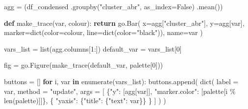 \documentclass[
  letterpaper,
  DIV=11,
  numbers=noendperiod]{scrreprt}
\newenvironment{Shaded}{\begin{snugshade}}{\end{snugshade}}
\newcommand{\BuiltInTok}[1]{\textcolor[rgb]{0.00,0.23,0.31}{#1}}
\newcommand{\ControlFlowTok}[1]{\textcolor[rgb]{0.00,0.23,0.31}{\textbf{#1}}}
\newcommand{\DecValTok}[1]{\textcolor[rgb]{0.68,0.00,0.00}{#1}}
\newcommand{\KeywordTok}[1]{\textcolor[rgb]{0.00,0.23,0.31}{\textbf{#1}}}
\newcommand{\NormalTok}[1]{\textcolor[rgb]{0.00,0.23,0.31}{#1}}
\newcommand{\OperatorTok}[1]{\textcolor[rgb]{0.37,0.37,0.37}{#1}}
\newcommand{\StringTok}[1]{\textcolor[rgb]{0.13,0.47,0.30}{#1}}
\newcommand{\VariableTok}[1]{\textcolor[rgb]{0.07,0.07,0.07}{#1}}
\begin{document}
\begin{Shaded}
\begin{Highlighting}[]
\NormalTok{agg }\OperatorTok{=}\NormalTok{ (df\_condensed}
\NormalTok{       .groupby(}\StringTok{"cluster\_abr"}\NormalTok{, as\_index}\OperatorTok{=}\VariableTok{False}\NormalTok{)}
\NormalTok{       .mean())}

\KeywordTok{def}\NormalTok{ make\_trace(var, colour):}
    \ControlFlowTok{return}\NormalTok{ go.Bar(}
\NormalTok{        x}\OperatorTok{=}\NormalTok{agg[}\StringTok{"cluster\_abr"}\NormalTok{],}
\NormalTok{        y}\OperatorTok{=}\NormalTok{agg[var],}
\NormalTok{        marker}\OperatorTok{=}\BuiltInTok{dict}\NormalTok{(color}\OperatorTok{=}\NormalTok{colour, line}\OperatorTok{=}\BuiltInTok{dict}\NormalTok{(color}\OperatorTok{=}\StringTok{"black"}\NormalTok{)),}
\NormalTok{        name}\OperatorTok{=}\NormalTok{var}
\NormalTok{    )}

\NormalTok{vars\_list   }\OperatorTok{=} \BuiltInTok{list}\NormalTok{(agg.columns[}\DecValTok{1}\NormalTok{:])}
\NormalTok{default\_var }\OperatorTok{=}\NormalTok{ vars\_list[}\DecValTok{0}\NormalTok{]}

\NormalTok{fig }\OperatorTok{=}\NormalTok{ go.Figure(make\_trace(default\_var, palette[}\DecValTok{0}\NormalTok{]))}

\NormalTok{buttons }\OperatorTok{=}\NormalTok{ []}
\ControlFlowTok{for}\NormalTok{ i, var }\KeywordTok{in} \BuiltInTok{enumerate}\NormalTok{(vars\_list):}
\NormalTok{    buttons.append(}
        \BuiltInTok{dict}\NormalTok{(}
\NormalTok{            label  }\OperatorTok{=}\NormalTok{ var,}
\NormalTok{            method }\OperatorTok{=} \StringTok{"update"}\NormalTok{,}
\NormalTok{            args   }\OperatorTok{=}\NormalTok{ [}
\NormalTok{                \{}\StringTok{"y"}\NormalTok{: [agg[var]],}
                 \StringTok{"marker.color"}\NormalTok{: [palette[i }\OperatorTok{\%} \BuiltInTok{len}\NormalTok{(palette)]]\},}
\NormalTok{                \{}
                  \StringTok{"yaxis"}\NormalTok{: \{}\StringTok{"title"}\NormalTok{: \{}\StringTok{"text"}\NormalTok{: var\}\}}
\NormalTok{                \}}
\NormalTok{            ]}
\NormalTok{        )}
\NormalTok{    )}


\end{Highlighting}
\end{Shaded}
\end{document}
